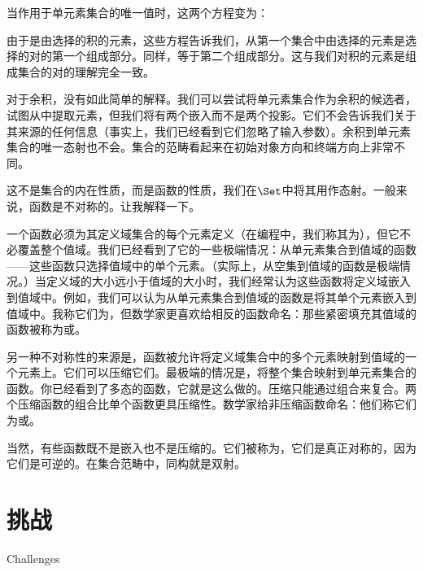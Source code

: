 当作用于单元素集合的唯一值\code{()}时，这两个方程变为：

由于是由选择的积的元素，这些方程告诉我们，从第一个集合中由选择的元素是选择的对的第一个组成部分。同样，等于第二个组成部分。这与我们对积的元素是组成集合的对的理解完全一致。

对于余积，没有如此简单的解释。我们可以尝试将单元素集合作为余积的候选者，试图从中提取元素，但我们将有两个嵌入而不是两个投影。它们不会告诉我们关于其来源的任何信息（事实上，我们已经看到它们忽略了输入参数）。余积到单元素集合的唯一态射也不会。集合的范畴看起来在初始对象方向和终端方向上非常不同。

这不是集合的内在性质，而是函数的性质，我们在$\Set$中将其用作态射。一般来说，函数是不对称的。让我解释一下。

一个函数必须为其定义域集合的每个元素定义（在编程中，我们称其为），但它不必覆盖整个值域。我们已经看到了它的一些极端情况：从单元素集合到值域的函数——这些函数只选择值域中的单个元素。（实际上，从空集到值域的函数是极端情况。）当定义域的大小远小于值域的大小时，我们经常认为这些函数将定义域嵌入到值域中。例如，我们可以认为从单元素集合到值域的函数是将其单个元素嵌入到值域中。我称它们为，但数学家更喜欢给相反的函数命名：那些紧密填充其值域的函数被称为或。

另一种不对称性的来源是，函数被允许将定义域集合中的多个元素映射到值域的一个元素上。它们可以压缩它们。最极端的情况是，将整个集合映射到单元素集合的函数。你已经看到了多态的函数，它就是这么做的。压缩只能通过组合来复合。两个压缩函数的组合比单个函数更具压缩性。数学家给非压缩函数命名：他们称它们为或。

当然，有些函数既不是嵌入也不是压缩的。它们被称为，它们是真正对称的，因为它们是可逆的。在集合范畴中，同构就是双射。

\section{挑战}{Challenges}

